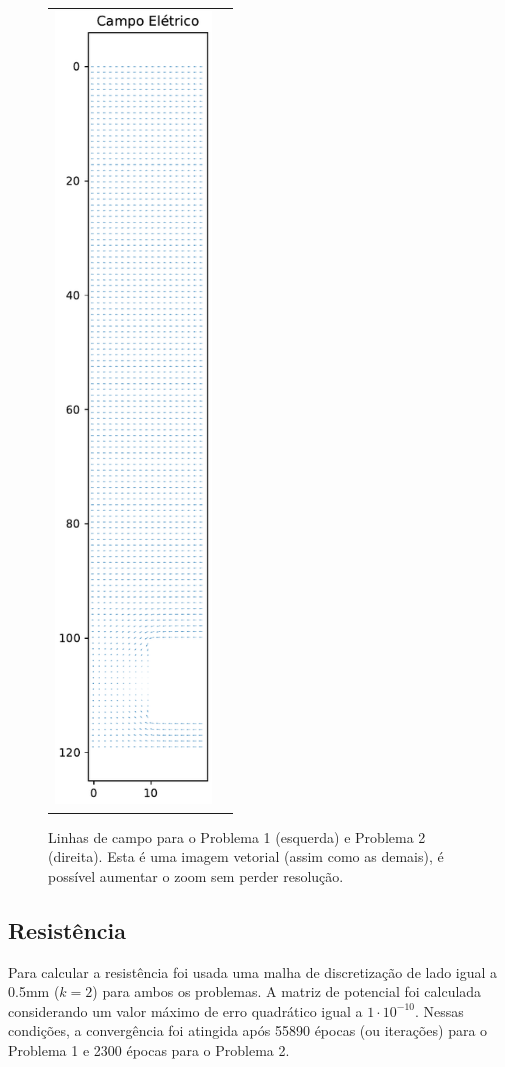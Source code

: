 \documentclass{aleph-revista}
\begin{document}
\begin{figure}[!ht]
\begin{tabular}{cc}
    \includegraphics[height=210mm]{p2_campo_eletrico}
  \end{tabular}
  \caption{Linhas de campo para o Problema 1 (esquerda) e Problema 2 (direita). Esta é uma imagem vetorial (assim como as demais), é possível aumentar o zoom sem perder resolução.}
  \label{fig:campo}
\end{figure}


\newpage
\subsection{Resistência}

Para calcular a resistência foi usada uma malha de discretização de lado igual a 0.5mm ($k=2$) para ambos os problemas. A matriz de potencial foi calculada considerando um valor máximo de erro quadrático igual a $1 \cdot 10^{-10}$. Nessas condições, a convergência foi atingida após 55890 épocas (ou iterações) para o Problema 1 e 2300 épocas para o Problema 2.
\end{document}
